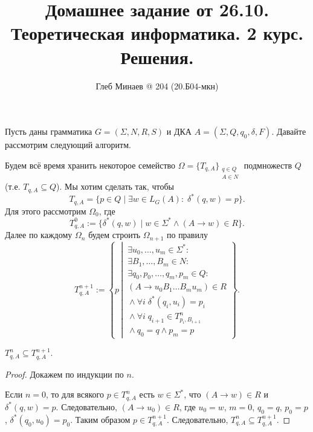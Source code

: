 \documentclass[12pt,a4paper]{article}
\title{Домашнее задание от 26.10.\\Теоретическая информатика. 2 курс.\\Решения.}
\author{Глеб Минаев @ 204 (20.Б04-мкн)}
\begin{document}
    \maketitle

    \begin{multicols}{2}
        \tableofcontents
    \end{multicols}

    \begin{problem}{2}
        Пусть даны грамматика $G = (\Sigma, N, R, S)$ и ДКА $A = (\Sigma, Q, q_0, \delta, F)$. Давайте рассмотрим следующий алгоритм.

        Будем всё время хранить некоторое семейство $\Omega = \{T_{q, A}\}_{\substack{q \in Q\\ A \in N}}$ подмножеств $Q$ (т.е. $T_{q, A} \subseteq Q$). Мы хотим сделать так, чтобы
        \[T_{q, A} = \{p \in Q \mid \exists w \in L_G(A) \colon \; \delta^*(q, w) = p\}.\]
        Для этого рассмотрим $\Omega_0$, где
        \[T^0_{q, A} := \{\delta^*(q, w) \mid w \in \Sigma^* \wedge (A \to w) \in R\}.\]
        Далее по каждому $\Omega_n$ будем строить $\Omega_{n+1}$ по правилу
        \[
            T^{n+1}_{q, A} := \left\{p \, \left| \,
            \begin{gathered}
                \exists u_0, \dots, u_m \in \Sigma^* \colon\\
                \exists B_1, \dots, B_m \in N \colon\\
                \exists q_0, p_0, \dots, q_m, p_m \in Q \colon\\
                (A \to u_0 B_1 \dots B_m u_m) \in R\\
                {} \wedge \forall i \; \delta^*(q_i, u_i) = p_i\\
                {} \wedge \forall i\; q_{i+1} \in T^n_{p_i, B_{i+1}}\\
                {} \wedge q_0 = q \wedge p_m = p
            \end{gathered}
            \right.\right\}.
        \]

        \begin{lemma}
            $T^n_{q, A} \subseteq T^{n+1}_{q, A}$.
        \end{lemma}

        \begin{proof}
            Докажем по индукции по $n$.

            Если $n = 0$, то для всякого $p \in T^n_{q, A}$ есть $w \in \Sigma^*$, что $(A \to w) \in R$ и $\delta^*(q, w) = p$. Следовательно, $(A \to u_0) \in R$, где $u_0 = w$, $m = 0$, $q_0 = q$, $p_0 = p$, $\delta^*(q_0, u_0) = p_0$. Таким образом $p \in T^{n+1}_{q, A}$. Следовательно, $T^n_{q, A} \subseteq T^{n+1}_{q, A}$.


\end{proof}
\end{problem}
\end{document}
